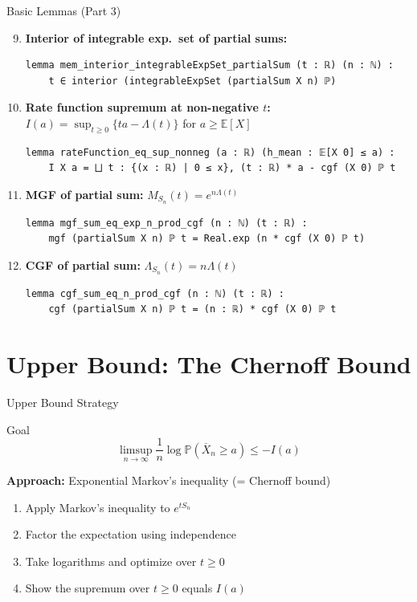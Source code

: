 \documentclass[aspectratio=169]{beamer}
\newcommand{\E}{\mathbb{E}}
\renewcommand{\P}{\mathbb{P}}
\begin{document}
\begin{frame}[fragile]{Basic Lemmas (Part 3)}
  \begin{enumerate}\setcounter{enumi}{8}
    \item \textbf{Interior of integrable exp.\ set of partial sums:}
\begin{lstlisting}[basicstyle=\ttfamily\tiny]
lemma mem_interior_integrableExpSet_partialSum (t : ℝ) (n : ℕ) :
    t ∈ interior (integrableExpSet (partialSum X n) ℙ)
\end{lstlisting}
    \item \textbf{Rate function supremum at non-negative $t$:} $I(a) = \sup_{t \ge 0}\{ta - \Lambda(t)\}$ for $a \ge \E[X]$
\begin{lstlisting}[basicstyle=\ttfamily\tiny]
lemma rateFunction_eq_sup_nonneg (a : ℝ) (h_mean : 𝔼[X 0] ≤ a) :
    I X a = ⨆ t : {(x : ℝ) | 0 ≤ x}, (t : ℝ) * a - cgf (X 0) ℙ t
\end{lstlisting}
    \item \textbf{MGF of partial sum:} $M_{S_n}(t) = e^{n\Lambda(t)}$
\begin{lstlisting}[basicstyle=\ttfamily\tiny]
lemma mgf_sum_eq_exp_n_prod_cgf (n : ℕ) (t : ℝ) :
    mgf (partialSum X n) ℙ t = Real.exp (n * cgf (X 0) ℙ t)
\end{lstlisting}
    \item \textbf{CGF of partial sum:} $\Lambda_{S_n}(t) = n\Lambda(t)$
\begin{lstlisting}[basicstyle=\ttfamily\tiny]
lemma cgf_sum_eq_n_prod_cgf (n : ℕ) (t : ℝ) :
    cgf (partialSum X n) ℙ t = (n : ℝ) * cgf (X 0) ℙ t
\end{lstlisting}
  \end{enumerate}
\end{frame}

\section{Upper Bound: The Chernoff Bound}

\begin{frame}{Upper Bound Strategy}
  \begin{block}{Goal}
    \[
      \limsup_{n \to \infty} \frac{1}{n}\log\P(\overline{X}_n \ge a) \le -I(a)
    \]
  \end{block}
  \vspace{0.3cm}
  \textbf{Approach:} Exponential Markov's inequality (= Chernoff bound)
  \begin{enumerate}
    \item Apply Markov's inequality to $e^{tS_n}$
    \item Factor the expectation using independence
    \item Take logarithms and optimize over $t \ge 0$
    \item Show the supremum over $t \ge 0$ equals $I(a)$
  \end{enumerate}
\end{frame}
\end{document}
